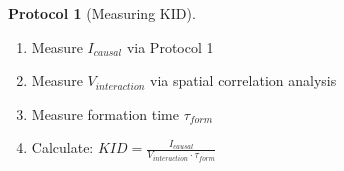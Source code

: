 \documentclass[11pt,a4paper]{article}
\theoremstyle{definition}
\newtheorem{protocol}{Protocol}[section]
\begin{document}
\begin{protocol}[Measuring KID]
\begin{enumerate}
\item Measure $I_{causal}$ via Protocol 1
\item Measure $V_{interaction}$ via spatial correlation analysis
\item Measure formation time $\tau_{form}$
\item Calculate: $KID = \frac{I_{causal}}{V_{interaction} \cdot \tau_{form}}$
\end{enumerate}
\end{protocol}
\end{document}
